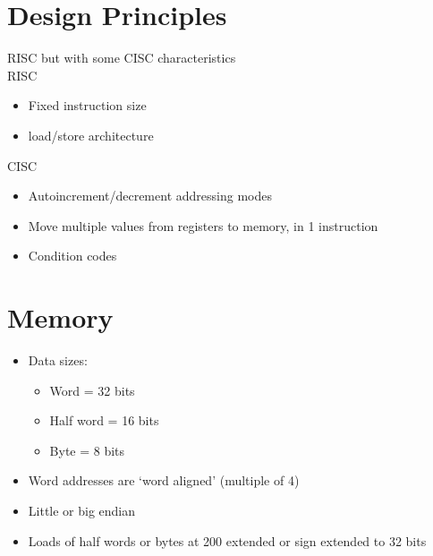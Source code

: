 \documentclass[12pt]{report}
\begin{document}
  \section{Design Principles}
    RISC but with some CISC characteristics\\
    RISC\:
    \begin{itemize}
      \item Fixed instruction size
      \item load/store architecture
    \end{itemize}
    CISC\:
    \begin{itemize}
      \item Autoincrement/decrement addressing modes
      \item Move multiple values from registers to memory, in 1 instruction
      \item Condition codes
    \end{itemize}
  \section{Memory}
    \begin{itemize}
      \item Data sizes:
        \begin{itemize}
          \item Word = 32 bits
          \item Half word = 16 bits
          \item Byte = 8 bits
        \end{itemize}
      \item Word addresses are `word aligned' (multiple of 4)
      \item Little or big endian
      \item Loads of half words or bytes at  200 extended or sign extended to
        32 bits
    \end{itemize}
\end{document}
